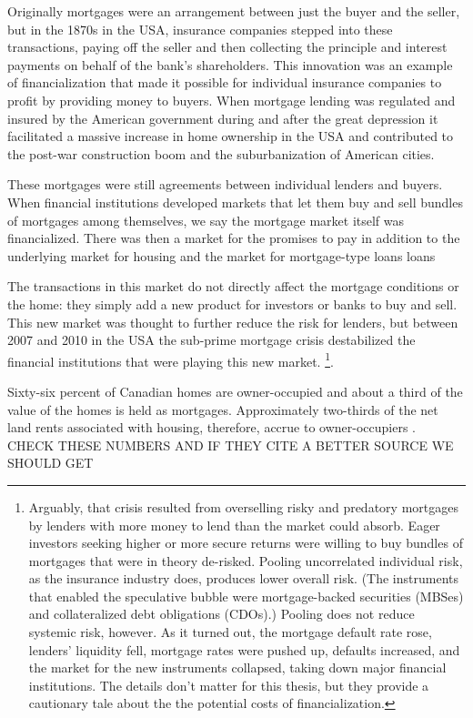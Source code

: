 Originally mortgages were an arrangement between just the buyer and the seller, but in the 1870s in the USA, insurance companies stepped into these transactions, paying off the seller and then collecting the principle and interest payments on behalf of the bank's shareholders. This innovation was an example of financialization that made it possible for individual insurance companies to profit by providing money to buyers. When mortgage lending was regulated and insured  by the American government during and after the great depression it facilitated a massive increase in home ownership in the USA and contributed to the post-war construction boom and the suburbanization of American cities. 

These mortgages were still agreements between individual lenders and buyers. When financial institutions developed markets that let them buy and sell bundles of mortgages among themselves, we say the mortgage market itself was financialized. There was then a market for the  promises to pay in addition to the underlying market for housing and the market for mortgage-type loans loans

The transactions in this market do not directly affect the mortgage conditions or the home: they simply add a new product for investors or banks to buy and sell. This new market was thought to further reduce the risk for lenders, but  between 2007 and 2010 in the USA the sub-prime mortgage crisis destabilized the financial institutions that were playing this new market. \footnote{Arguably, that crisis resulted from overselling risky and predatory mortgages by lenders with more money to lend than the market could absorb. Eager investors seeking higher or more secure returns were willing  to buy bundles of  mortgages that were in theory de-risked. Pooling uncorrelated individual risk, as the insurance industry does, produces lower overall risk. (The instruments that enabled the speculative bubble were mortgage-backed securities (MBSes) and collateralized debt obligations (CDOs).) Pooling does not reduce systemic risk, however. As it turned out, the mortgage default rate rose, lenders' liquidity fell, mortgage rates were pushed up, defaults increased, and the market for the new instruments collapsed, taking down major financial institutions. The details don't matter for this thesis, but they provide a cautionary tale about the the potential costs of financialization.}.  

Sixty-six percent of Canadian homes are owner-occupied and about a third of the value of the homes is held as mortgages. Approximately two-thirds of the net land rents associated with housing, therefore, accrue to owner-occupiers \cite{nemtinFinancializationHousingSocial2021}. {\color {red}CHECK THESE NUMBERS AND IF THEY CITE A BETTER SOURCE WE SHOULD GET} 

